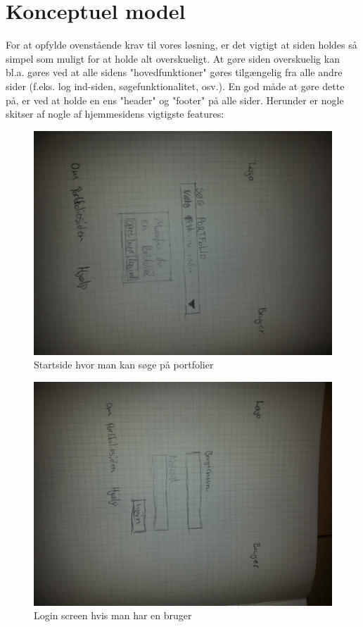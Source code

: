 \documentclass[a4paper,titlepage,fleqn,12pt]{article}
\begin{document}
\section{Konceptuel model}
For at opfylde ovenstående krav til vores løsning, er det vigtigt at siden holdes så simpel som muligt for at holde alt overskueligt. At gøre siden overskuelig kan bl.a. gøres ved at alle sidens "hovedfunktioner" gøres tilgængelig fra alle andre sider (f.eks. log ind-siden, søgefunktionalitet, osv.). En god måde at gøre dette på, er ved at holde en ens "header" og "footer" på alle sider. Herunder er nogle skitser af nogle af hjemmesidens vigtigste features:
\begin{figure}[H]
\includegraphics[width=\textwidth]{startside.jpg}
\caption{Startside hvor man kan søge på portfolier}
\end{figure}

\begin{figure}[H]
\includegraphics[width=\textwidth]{login.jpg}
\caption{Login screen hvis man har en bruger}
\end{figure}
\end{document}
